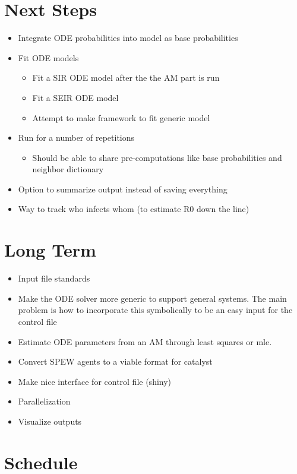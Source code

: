 \documentclass{article}
\begin{document}
\section{Next Steps}
\label{sec-4}
\begin{itemize}
\item Integrate ODE probabilities into model as base probabilities
\item Fit ODE models
\begin{itemize}
\item Fit a SIR ODE model after the the AM part is run
\item Fit a SEIR ODE model
\item Attempt to make framework to fit generic model
\end{itemize}
\item Run for a number of repetitions
\begin{itemize}
\item Should be able to share pre-computations like base probabilities and neighbor dictionary
\end{itemize}
\item Option to summarize output instead of saving everything
\item Way to track who infects whom (to estimate R0 down the line)
\end{itemize}




\section{Long Term}
\label{sec-5}
\begin{itemize}
\item Input file standards
\item Make the ODE solver more generic to support general systems.  The main problem is how to incorporate this symbolically to be an easy input for the control file
\item Estimate ODE parameters from an AM through least squares or mle.
\item Convert SPEW agents to a viable format for catalyst
\item Make nice interface for control file (shiny)
\item Parallelization
\item Visualize outputs
\end{itemize}

\section{Schedule}
\label{sec-6}
\end{document}
